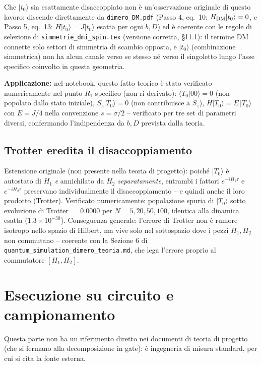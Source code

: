 \documentclass[11pt,a4paper]{article}
\begin{document}
Che $|t_0\rangle$ sia esattamente disaccoppiato non è un'osservazione
originale di questo lavoro: discende direttamente da
\texttt{dimero\_DM.pdf} (Passo 4, eq.~10: $H_{\rm DM}|t_0\rangle=0$, e Passo
5, eq.~13: $H|t_0\rangle=J|t_0\rangle$ esatta per ogni $b,D$) ed è coerente
con le regole di selezione di \texttt{simmetrie\_dmi\_spin.tex} (versione
corretta, \S11.1): il termine DM connette solo settori di simmetria di
scambio opposta, e $|t_0\rangle$ (combinazione simmetrica) non ha alcun
canale verso se stesso né verso il singoletto lungo l'asse specifico
coinvolto in questa geometria.

\textbf{Applicazione:} nel notebook, questo fatto teorico è stato verificato
numericamente nel punto $R_1$ specifico (non ri-derivato): $\langle
T_0|00\rangle=0$ (non popolato dallo stato iniziale), $S_z|T_0\rangle=0$
(non contribuisce a $S_z$), $H|T_0\rangle=E\,|T_0\rangle$ con
$E=J/4$ nella convenzione $s=\sigma/2$ -- verificato per tre set di
parametri diversi, confermando l'indipendenza da $b,D$ prevista dalla
teoria.

\subsection{Trotter eredita il disaccoppiamento}

Estensione originale (non presente nella teoria di progetto): poiché
$|T_0\rangle$ è autostato di $H_1$ \emph{e} annichilato da $H_2$
\emph{separatamente}, entrambi i fattori $e^{-iH_1\tau}$ e $e^{-iH_2\tau}$
preservano individualmente il disaccoppiamento -- e quindi anche il loro
prodotto (Trotter). Verificato numericamente: popolazione spuria di
$|T_0\rangle$ sotto evoluzione di Trotter $=0.0000$ per $N=5,20,50,100$,
identica alla dinamica esatta ($1.3\times10^{-30}$). Conseguenza generale:
l'errore di Trotter non è rumore isotropo nello spazio di Hilbert, ma vive
solo nel sottospazio dove i pezzi $H_1,H_2$ non commutano -- coerente con
la Sezione 6 di \texttt{quantum\_simulation\_dimero\_teoria.md}, che lega
l'errore proprio al commutatore $[H_1,H_2]$.

\section{Esecuzione su circuito e campionamento}

Questa parte non ha un riferimento diretto nei documenti di teoria di
progetto (che si fermano alla decomposizione in gate): è ingegneria di
misura standard, per cui si cita la fonte esterna.
\end{document}
